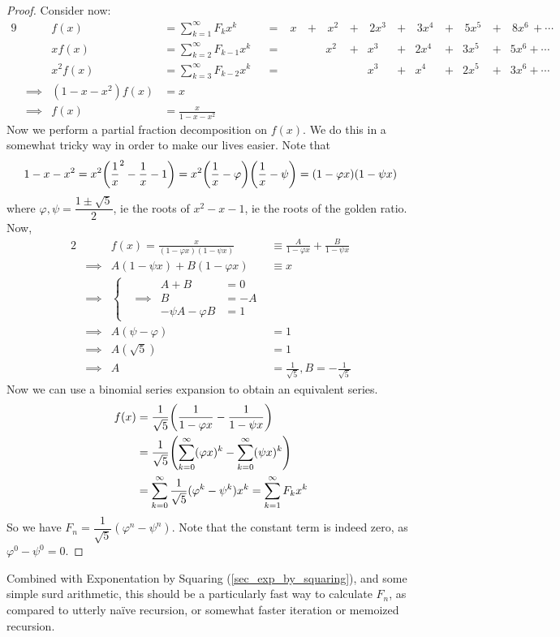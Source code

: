\begin{proof}
Consider now:
\begin{alignat*}{9}
&& f(x) &= \sum_{k = 1}^\infty F_k x^k
    &&=&\; x\, &+&\, x^2\, &+&\, 2x^3\, &+&\,
        3x^4\, &+&\, 5x^5\, &+&\, 8x^6\, + \dotsb \\
&& x f(x) &= \sum_{k = 2}^\infty F_{k - 1} x^k
    &&=& &&x^2 &+& x^3 &+& 2x^4 &+& 3x^5 &+& 5x^6 + \dotsb \\
&& x^2 f(x) &= \sum_{k = 3}^\infty F_{k - 2}x^k
    &&=& &&&& x^3 &+& x^4 &+& 2x^5 &+& 3x^6 + \dotsb \\
&\implies& (1 - x - x^2) f(x) &= x \\
&\implies& f(x) &= \frac x{1 - x - x^2}
\end{alignat*}
Now we perform a partial fraction decomposition on \(f(x)\). We do this in a
somewhat tricky way in order to make our lives easier. Note that
\begin{equation*}
1 - x - x^2 = x^2 \pqty{\frac 1x^2 - \frac 1x - 1}
    = x^2\pqty{\frac 1x - \varphi}\pqty{\frac 1x - \psi}
    = (1 - \varphi x)(1 - \psi x)
\end{equation*}
where \(\varphi, \psi = \dfrac{1 \pm \sqrt 5}2\), ie the roots of
\(x^2 - x - 1\), ie the roots of the golden ratio. Now,
\begin{alignat*}{2}
&& f(x) = \frac x{(1 - \varphi x)(1 - \psi x)}
    &\equiv \frac A{1 - \varphi x} + \frac B{1 - \psi x} \\
&\implies& A(1 - \psi x) + B(1 - \varphi x) &\equiv x \\
&\implies& \left\{
    \begin{aligned}
        && A + B &= 0 \\
        &\implies& B &= -A  \\
        && -\psi A - \varphi B &= 1
    \end{aligned} \right. \\
&\implies& A(\psi - \varphi) &= 1 \\
&\implies& A(\sqrt 5) &= 1 \\
&\implies& A &= \frac 1{\sqrt 5}, B = -\frac 1{\sqrt 5}
\end{alignat*}
Now we can use a binomial series expansion to obtain an equivalent series.
\begin{align*}
f(x) &= \frac 1{\sqrt 5}\pqty{\frac 1{1 - \varphi x}
                            - \frac 1{1 - \psi x}} \\
&= \frac 1{\sqrt 5}\pqty{\sum_{k = 0}^\infty (\varphi x)^k
                       - \sum_{k = 0}^\infty (\psi x)^k} \\
&= \sum_{k = 0}^\infty \frac 1{\sqrt 5}(\varphi^k - \psi^k)x^k
= \sum_{k = 1}^\infty F_k x^k
\end{align*}
So we have \(F_n = \dfrac 1{\sqrt 5}(\varphi^n - \psi^n)\). Note that the
constant term is indeed zero, as \(\varphi^0 - \psi^0 = 0\).
\end{proof}
Combined with Exponentation by Squaring (\ref{sec_exp_by_squaring}), and
some simple surd arithmetic, this should be a particularly fast way to
calculate \(F_n\), as compared to utterly na\"ive recursion, or somewhat
faster iteration or memoized recursion.
